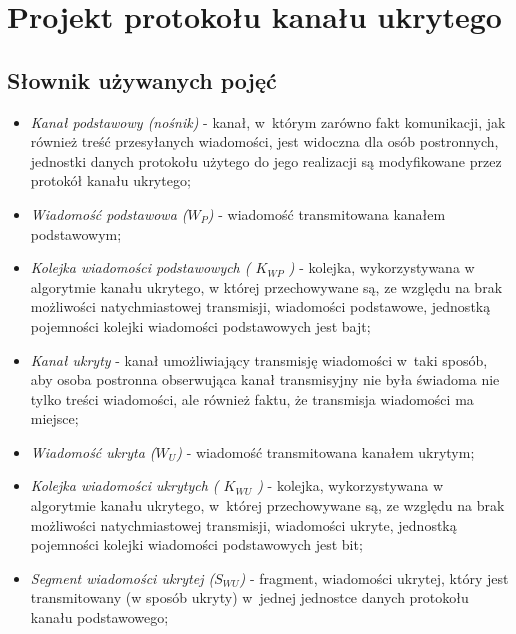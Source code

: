 \documentclass[a4paper, twoside, 12pt]{report}
\begin{document}
\chapter{Projekt protokołu kanału ukrytego}
    \section{Słownik używanych pojęć} \label{DICT}
    \begin{itemize}
        \item \emph{Kanał podstawowy (nośnik)} - kanał, w~którym zarówno fakt komunikacji,
            jak również treść przesyłanych wiadomości, jest widoczna dla osób postronnych,
            jednostki danych protokołu użytego do jego realizacji są modyfikowane przez
            protokół kanału ukrytego;

        \item \emph{Wiadomość podstawowa (\(W_P\))} - wiadomość transmitowana kanałem
            podstawowym;

        \item \emph{Kolejka wiadomości podstawowych ( \( K_{WP} \) )} - kolejka,
                wykorzystywana w algorytmie kanału ukrytego, w
                której przechowywane są, ze względu na brak możliwości natychmiastowej
                transmisji, wiadomości podstawowe, jednostką pojemności kolejki
                wiadomości podstawowych jest bajt;

        \item \emph{Kanał ukryty} - kanał umożliwiający transmisję wiadomości w~taki sposób,
            aby osoba postronna obserwująca kanał transmisyjny nie była świadoma
            nie tylko treści wiadomości, ale również faktu, że transmisja wiadomości ma miejsce;

        \item \emph{Wiadomość ukryta (\(W_U\))} - wiadomość transmitowana kanałem ukrytym;

        \item \emph{Kolejka wiadomości ukrytych ( \( K_{WU} \) )} - kolejka,
                wykorzystywana w algorytmie kanału ukrytego, w~której
                przechowywane są, ze względu na brak możliwości natychmiastowej
                transmisji, wiadomości ukryte, jednostką pojemności kolejki
                wiadomości podstawowych jest bit;

        \item \emph{Segment wiadomości ukrytej (\(S_{WU}\))} - fragment,
            wiadomości ukrytej, który jest transmitowany (w sposób ukryty) w~jednej
            jednostce danych protokołu kanału podstawowego;


\end{itemize}
\end{document}
